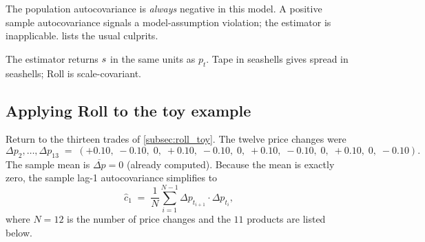 \begin{remark}[Sign]
The population autocovariance is \emph{always} negative in this
model. A positive sample autocovariance signals a model-assumption
violation; the estimator is inapplicable. 
lists the usual culprits.
\end{remark}

\begin{remark}[Units]
The estimator returns $s$ in the same units as $p_t$.
Tape in seashells gives spread in seashells; Roll is
scale-covariant.
\end{remark}

\subsection{Applying Roll to the toy example}
\label{subsec:roll_toy_payoff}

Return to the thirteen trades of \cref{subsec:roll_toy}. The
twelve price changes were
\[
  \Delta p_2, \ldots, \Delta p_{13}
  \;=\;
  (+0.10,\;-0.10,\;0,\;+0.10,\;-0.10,\;0,\;+0.10,\;-0.10,\;0,\;+0.10,\;0,\;-0.10).
\]
The sample mean is $\overline{\Delta p} = 0$ (already computed).
Because the mean is exactly zero, the sample lag-1 autocovariance
simplifies to
\[
  \hat c_1
  \;=\; \frac{1}{N} \sum_{i=1}^{N-1} \Delta p_{t_{i+1}} \cdot \Delta p_{t_i},
\]
where $N = 12$ is the number of price changes and the $11$
products are listed below.

